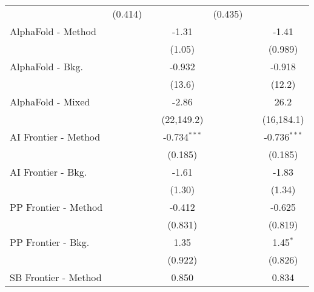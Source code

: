 \begin{tabular}{lcccccc}
                                & (0.414)       &                &                & (0.435)       &                &   \\   
   AlphaFold - Method           &               &                & -1.31          &               &                & -1.41\\   
                                &               &                & (1.05)         &               &                & (0.989)\\   
   AlphaFold - Bkg.             &               &                & -0.932         &               &                & -0.918\\   
                                &               &                & (13.6)         &               &                & (12.2)\\   
   AlphaFold - Mixed            &               &                & -2.86          &               &                & 26.2\\   
                                &               &                & (22,149.2)     &               &                & (16,184.1)\\   
   AI Frontier - Method         &               &                & -0.734$^{***}$ &               &                & -0.736$^{***}$\\   
                                &               &                & (0.185)        &               &                & (0.185)\\   
   AI Frontier - Bkg.           &               &                & -1.61          &               &                & -1.83\\   
                                &               &                & (1.30)         &               &                & (1.34)\\   
   PP Frontier - Method         &               &                & -0.412         &               &                & -0.625\\   
                                &               &                & (0.831)        &               &                & (0.819)\\   
   PP Frontier - Bkg.           &               &                & 1.35           &               &                & 1.45$^{*}$\\   
                                &               &                & (0.922)        &               &                & (0.826)\\   
   SB Frontier - Method         &               &                & 0.850          &               &                & 0.834\\   

\end{tabular}
